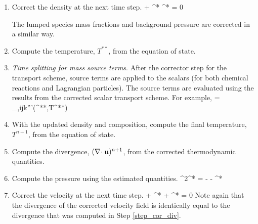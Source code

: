 \begin{enumerate}

\item Correct the density at the next time step.
\be
{} +  \nabla\!\cdot \rho^* \bu^* = 0
\ee

The lumped species mass fractions and background pressure are corrected in a similar way.

\item Compute the temperature, $T^{**}$, from the equation of state.

\item \emph{Time splitting for mass source terms}. After the corrector step for the transport scheme, source terms are applied to the scalars (for both chemical reactions and Lagrangian particles).  The source terms are evaluated using the results from the corrected scalar transport scheme.  For example,
\be
{} =  \dm_{\alpha,ijk}'''(^{**},T^{**})
\ee

\item With the updated density and composition, compute the final temperature, $T^{n+1}$, from the equation of state.

\item \label{step_cor_div} Compute the divergence, $(\nabla\!\cdot {\mathbf{u}})^{n+1}$, from the corrected thermodynamic quantities.

\item Compute the pressure using the estimated quantities.
\be
\label{eqn_corrector_poisson2}
\nabla^2\calH^* = - 
   - \nabla\!\cdot {}^*
\ee

\item Correct the velocity at the next time step.
\be
{} + ^* + \nabla \calH^*  = 0
\ee
Note again that the divergence of the corrected velocity field is identically equal to the divergence that was computed in Step \ref{step_cor_div}.


\end{enumerate}
